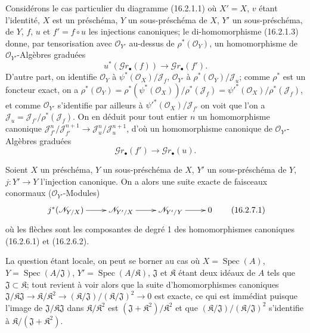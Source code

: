 \begin{env}[16.2.6]
\label{IV.16.2.6}
Considérons le cas particulier du diagramme (16.2.1.1) où $X'=X$, $v$ étant
l'identité, $X$ est un préschéma, $Y$ un sous-préschéma de $X$, $Y'$ un
sous-préschéma, de $Y$, $f$, $u$ et $f'=f\circ u$ les injections canoniques; le
di-homomorphisme (16.2.1.3) donne, par tensorisation avec
$\mathcal{O}_{Y'}$ au-dessus de $\rho^*(\mathcal{O}_Y)$, un homomorphisme de
$\mathcal{O}_{Y'}$-Algèbres graduées
\[
  u^*(\mathscr{G}r_\bullet(f))
  \longrightarrow\mathscr{G}r_\bullet(f').
  \tag{16.2.6.1}
  \label{IV.16.2.6.1}
\]
D'autre part, on identifie $\mathcal{O}_Y$ à
$\psi^*(\mathcal{O}_X)/\mathscr{J}_f$, $\mathcal{O}_{Y'}$ à
$\rho^*(\mathcal{O}_Y)/\mathscr{J}_u$; comme $\rho^*$ est un foncteur exact,
on a
$\rho^*(\mathcal{O}_Y)=
\rho^*(\psi^*(\mathcal{O}_X))/\rho^*(\mathscr{J}_f)=
\psi'^*(\mathcal{O}_X)/\rho^*(\mathscr{J}_f)$, et comme
$\mathcal{O}_{Y'}$ s'identifie par ailleurs à
$\psi'^*(\mathcal{O}_X)/\mathscr{J}_{f'}$ on voit que l'on a
$\mathscr{J}_u=\mathscr{J}_{f'}/\rho^*(\mathscr{J}_f)$. On en déduit pour
tout entier $n$ un homomorphisme canonique
$\mathscr{J}_{f'}^n/\mathscr{J}_{f'}^{n+1}\to
\mathscr{J}_u^n/\mathscr{J}_u^{n+1}$, d'où un homomorphisme canonique de
$\mathcal{O}_{Y'}$-Algèbres graduées
\[
  \mathscr{G}r_\bullet(f')
  \longrightarrow\mathscr{G}r_\bullet(u).
  \tag{16.2.6.2}
  \label{IV.16.2.6.2}
\]
\end{env}

\begin{proposition}[16.2.7]
\label{IV.16.2.7}
Soient $X$ un préschéma, $Y$ un sous-préschéma de $X$, $Y'$ un
sous-préschéma de $Y$, $j:Y'\to Y$ l'injection canonique. On a alors une suite
exacte de faisceaux conormaux ($\mathcal{O}_{Y'}$-Modules)
\[
  \xymatrix{
    j^*(\mathscr{N}_{Y/X}) \ar[r] &
    \mathscr{N}_{Y'/X} \ar[r] &
    \mathscr{N}_{Y'/Y} \ar[r] & 0
  }
  \tag{16.2.7.1}
  \label{IV.16.2.7.1}
\]
où les flèches sont les composantes de degré 1 des homomorphismes canoniques
\textup{(16.2.6.1)} et \textup{(16.2.6.2)}.
\end{proposition}

La question étant locale, on peut se borner au cas où
$X=\operatorname{Spec}(A)$, $Y=\operatorname{Spec}(A/\mathfrak{J})$,
$Y'=\operatorname{Spec}(A/\mathfrak{K})$, $\mathfrak{J}$ et $\mathfrak{K}$
étant deux idéaux de $A$ tels que $\mathfrak{J}\subset\mathfrak{K}$; tout
revient à voir alors
que la suite d'homomorphismes canoniques
$\mathfrak{J}/\mathfrak{K}\mathfrak{J}\to
\mathfrak{K}/\mathfrak{K}^2\to
(\mathfrak{K}/\mathfrak{J})/(\mathfrak{K}/\mathfrak{J})^2\to 0$
est exacte, ce qui est immédiat puisque l'image de
$\mathfrak{J}/\mathfrak{K}\mathfrak{J}$ dans
$\mathfrak{K}/\mathfrak{K}^2$ est
$(\mathfrak{J}+\mathfrak{K}^2)/\mathfrak{K}^2$ et que
$(\mathfrak{K}/\mathfrak{J})/(\mathfrak{K}/\mathfrak{J})^2$ s'identifie à
$\mathfrak{K}/(\mathfrak{J}+\mathfrak{K}^2)$.

